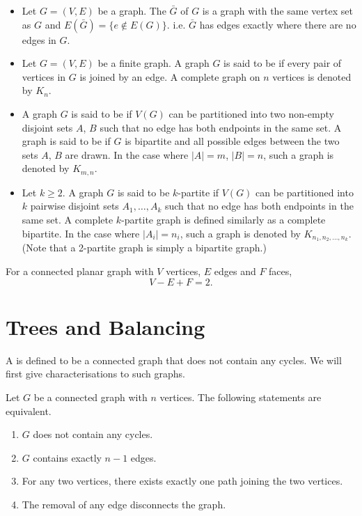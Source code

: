 \begin{itemize}
\item Let $G=(V,E)$ be a graph. The  $\bar{G}$ of $G$ is a graph with the same vertex set as $G$ and $E(\bar{G})=\{e\notin E(G)\}$. i.e. $\bar{G}$ has edges exactly where there are no edges in $G$.

\item Let $G=(V,E)$ be a finite graph. A graph $G$ is said to be  if every pair of vertices in $G$ is joined by an edge. A complete graph on $n$ vertices is denoted by $K_n$.

\item A graph $G$ is said to be  if $V(G)$ can be partitioned into two non-empty disjoint sets $A$, $B$ such that no edge has both endpoints in the same set. A graph is said to be  if $G$ is bipartite and all possible edges between the two sets $A$, $B$ are drawn. In the case where $|A|=m$, $|B|=n$, such a graph is denoted by $K_{m,n}$.

\item Let $k\ge2$. A graph $G$ is said to be $k$-partite if $V(G)$ can be partitioned into $k$ pairwise disjoint sets $A_1,\dots,A_k$ such that no edge has both endpoints in the same set. A complete $k$-partite graph is defined similarly as a complete bipartite. In the case where $|A_i|=n_i$, such a graph is denoted by $K_{n_1,n_2,\dots,n_k}$. (Note that a 2-partite graph is simply a bipartite graph.)
\end{itemize}

\begin{theorem}[Euler]
For a connected planar graph with $V$ vertices, $E$ edges and $F$ faces,
\begin{equation}
V-E+F=2.
\end{equation}
\end{theorem}

\section{Trees and Balancing}
A  is defined to be a connected graph that does not contain any cycles. We will first give characterisations to such graphs.

\begin{lemma}
Let $G$ be a connected graph with $n$ vertices. The following
statements are equivalent.
\begin{enumerate}
\item $G$ does not contain any cycles.
\item $G$ contains exactly $n-1$ edges.
\item For any two vertices, there exists exactly one path joining the two vertices.
\item The removal of any edge disconnects the graph.
\end{enumerate}
\end{lemma}

